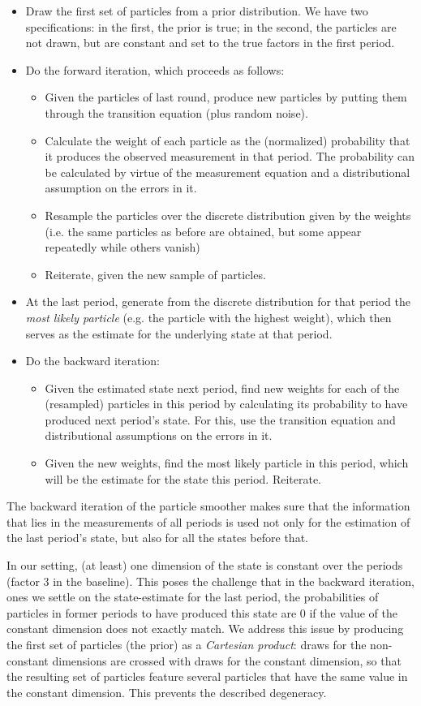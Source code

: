 \documentclass[11pt, a4paper, leqno]{article}
\begin{document}
\begin{itemize}
	\item Draw the first set of particles from a prior distribution. We have two specifications: in the first, the prior is true; in the second, the particles are not drawn, but are constant and set to the true factors in the first period.
	\item Do the forward iteration, which proceeds as follows:
	\begin{itemize}
		\item Given the particles of last round, produce new particles by putting them through the transition equation (plus random noise).
		\item Calculate the weight of each particle as the (normalized) probability that it produces the observed measurement in that period. The probability can be calculated by virtue of the measurement equation and a distributional assumption on the errors in it.
		\item Resample the particles over the discrete distribution given by the weights (i.e. the same particles as before are obtained, but some appear repeatedly while others vanish)
		\item Reiterate, given the new sample of particles.
	\end{itemize}
	\item At the last period, generate from the discrete distribution for that period the \textit{most likely particle} (e.g. the particle with the highest weight), which then serves as the estimate for the underlying state at that period.
	\item Do the backward iteration:
	\begin{itemize}
		\item Given the estimated state next period, find new weights for each of the (resampled) particles in this period by calculating its probability to have produced next period's state. For this, use the transition equation and distributional assumptions on the errors in it.
		\item Given the new weights, find the most likely particle in this period, which will be the estimate for the state this period. Reiterate.
	\end{itemize}
\end{itemize}
The backward iteration of the particle smoother makes sure that the information that lies in the measurements of all periods is used not only for the estimation of the last period's state, but also for all the states before that.\par
In our setting, (at least) one dimension of the state is constant over the periods (factor 3 in the baseline). This poses the challenge that in the backward iteration, ones we settle on the state-estimate for the last period, the probabilities of particles in former periods to have produced this state are 0 if the value of the constant dimension does not exactly match. We address this issue by producing the first set of particles (the prior) as a \textit{Cartesian product}: draws for the non-constant dimensions are crossed with draws for the constant dimension, so that the resulting set of particles feature several particles that have the same value in the constant dimension. This prevents the described degeneracy.
\newpage
\end{document}
